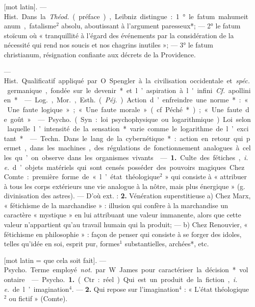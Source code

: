 \begin{itemize}[leftmargin=1cm, label=, itemsep=1pt]
 [mot latin]. — \si{Hist.} Dans la
{\it Théod.} (préface), Leïbniz distingue : 1° le fatum mahumeitanum,
fatalisme$^2$ absolu, aboutissant à l’argument paresseux*; — 2° le fatum
stoïcum où « tranquillité à l'égard des événements par la
considération de la nécessité qui
rend nos soucis et nos chagrins inutiles »; — 3° le fatum christianum,
résignation confiante aux décrets de
la Providence.

 — \si{Hist.} Qualificatif appliqué
par O. Spengler à la civilisation
occidentale et {\it spéc.} germanique,
fondée sur le devenir* et l’aspiration à l'infini. {\it Cf.} apollinien*.

 — \si{Log.}, \si{Mor.}, \si{Esth.} ({\it Péj.}) Action
d’enfreindre une norme* : « Une
faute logique »; « Une faute morale »
(cf. Péché*); « Une faute de goût ».

 — \si{Psycho.} (Syn. :
loi psychophysique ou logarithmique).
Loi selon laquelle l’intensité de la
sensation* varie comme le logarithme de l’excitant*.

 — \si{Techn.} Dans le lang. de
la cybernétique* : action en retour
qui permet, dans les machines, des
régulations de fonctionnement analogues à celles qu’on observe dans
les organismes vivants.

 — {\bf 1.} Culte des fétiches,
{\it i. e.} d’objets matériels qui sont
censés posséder des pouvoirs magiques. Chez Comte : première forme
de « l’état théologique$^2$ » qui consiste
à « attribuer à tous les corps extérieurs une vie analogue à la nôtre,
mais plus énergique » (g. divinisation des astres). — D'où ext. : {\bf 2.} Vénération superstitieuse a) Chez
Marx, « fétichisme de la marchandise » : illusion qui confère à la marchandise un caractère « mystique »
en lui attribuant une valeur immanente, alors que cette valeur n’appartient qu'au travail humain qui la
produit; — b) Chez Renouvier,
« fétichisme en philosophie » : façon
de penser qui consiste à se forger
des idoles, telles qu’idée en soi,
esprit pur, formes$^1$ substantielles,
archées*, etc.

 [mot latin = que cela soit fait].
— \si{Psycho.} Terme employé {\it not.} par
W. James pour caractériser la décision* volontaire.

 — \si{Psycho.} {\bf 1.} (Ctr. : réel). Qui
est un produit de la fiction, {\it i. e.} de
l’imagination$^4$. — {\bf 2.} Qui repose sur
l'imagination$^4$ : « L'état théologique$^2$ ou fictif » (Comte).


\end{itemize}
